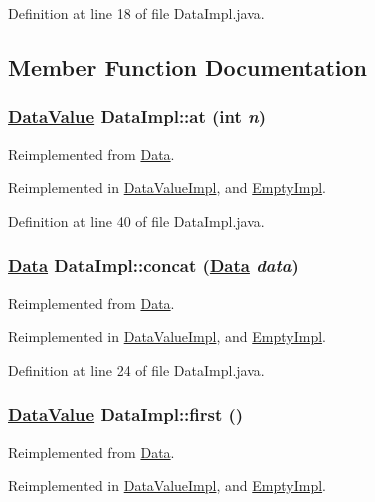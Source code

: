 Definition at line 18 of file Data\-Impl.java.

\subsection{Member Function Documentation}
\hypertarget{classDataImpl_a4}{
\subsubsection[at]{\setlength{\rightskip}{0pt plus 5cm}\hyperlink{interfaceDataValue}{Data\-Value} Data\-Impl::at (int {\em n})}}
\label{classDataImpl_a4}




Reimplemented from \hyperlink{interfaceData_a4}{Data}.

Reimplemented in \hyperlink{classDataValueImpl_a4}{Data\-Value\-Impl}, and \hyperlink{classEmptyImpl_a0}{Empty\-Impl}.

Definition at line 40 of file Data\-Impl.java.\hypertarget{classDataImpl_a0}{
\subsubsection[concat]{\setlength{\rightskip}{0pt plus 5cm}\hyperlink{interfaceData}{Data} Data\-Impl::concat (\hyperlink{interfaceData}{Data} {\em data})}}
\label{classDataImpl_a0}




Reimplemented from \hyperlink{interfaceData_a0}{Data}.

Reimplemented in \hyperlink{classDataValueImpl_a3}{Data\-Value\-Impl}, and \hyperlink{classEmptyImpl_a2}{Empty\-Impl}.

Definition at line 24 of file Data\-Impl.java.\hypertarget{classDataImpl_a2}{
\subsubsection[first]{\setlength{\rightskip}{0pt plus 5cm}\hyperlink{interfaceDataValue}{Data\-Value} Data\-Impl::first ()}}
\label{classDataImpl_a2}




Reimplemented from \hyperlink{interfaceData_a2}{Data}.

Reimplemented in \hyperlink{classDataValueImpl_a0}{Data\-Value\-Impl}, and \hyperlink{classEmptyImpl_a1}{Empty\-Impl}.

